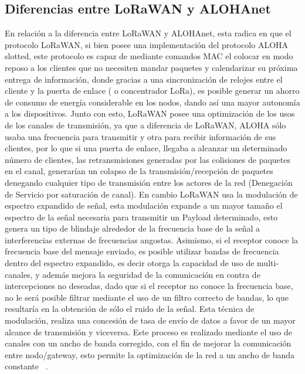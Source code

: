 \begin{justify}
\subsection{Diferencias entre LoRaWAN y ALOHAnet}
En relación a la diferencia entre LoRaWAN y ALOHAnet, esta radica en que el protocolo LoRaWAN, si bien posee una implementación del protocolo ALOHA slotted, este protocolo es capaz de mediante comandos MAC el colocar en modo reposo a los clientes que no necesiten mandar paquetes y calendarizar su próxima entrega de información, donde gracias a una sincronización de relojes entre el cliente y la puerta de enlace ( o concentrador LoRa), es posible generar un ahorro de consumo de energía considerable en los nodos, dando así una mayor autonomía a los dispositivos. Junto con esto, LoRaWAN posee una optimización de los usos de los canales de transmisión, ya que a diferencia de LoRaWAN, ALOHA sólo usaba una frecuencia para transmitir y otra para recibir información de sus clientes, por lo que si una puerta de enlace, llegaba a alcanzar un determinado número de clientes, las retransmisiones generadas por las colisiones de paquetes en el canal, generarían un colapso de la transmisión/recepción de paquetes denegando cualquier tipo de transmisión entre los actores de la red (Denegación de Servicio por saturación de canal). En cambio LoRaWAN usa la modulación de espectro expandido de señal, esta modulación expande a un mayor tamaño el espectro de la señal necesaria para transmitir un Payload determinado, esto genera un tipo de blindaje alrededor de la frecuencia base de la señal a interferencias externas de frecuencias angostas. Asimismo, si el receptor conoce la frecuencia base del mensaje enviado, es posible utilizar bandas de frecuencia dentro del espectro expandido, es decir otorga la capacidad de uso de multi-canales, y además mejora la seguridad de la comunicación en contra de intercepciones no deseadas, dado que si el receptor no conoce la frecuencia base, no le será posible filtrar mediante el uso de un filtro correcto de bandas, lo que resultaría en la obtención de sólo el ruido de la señal. Esta técnica de modulación, realiza una concesión de tasa de envío de datos a favor de un mayor alcance de transmisión y viceversa. Este proceso es realizado mediante el uso de canales con un ancho de banda corregido, con el fin de mejorar la comunicación entre nodo/gateway, esto permite la optimización de la red a un ancho de banda constante ~\cite{modulation}.


\end{justify}

